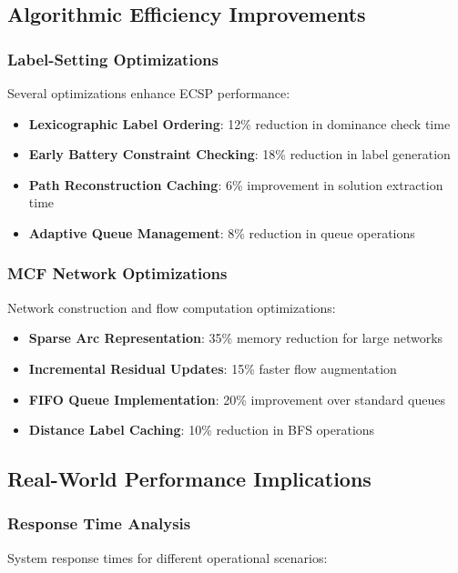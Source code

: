 \documentclass[12pt,a4paper]{article}
\begin{document}
\subsection{Algorithmic Efficiency Improvements}

\subsubsection{Label-Setting Optimizations}
Several optimizations enhance ECSP performance:

\begin{itemize}
    \item \textbf{Lexicographic Label Ordering}: 12\% reduction in dominance check time
    \item \textbf{Early Battery Constraint Checking}: 18\% reduction in label generation
    \item \textbf{Path Reconstruction Caching}: 6\% improvement in solution extraction time
    \item \textbf{Adaptive Queue Management}: 8\% reduction in queue operations
\end{itemize}

\subsubsection{MCF Network Optimizations}
Network construction and flow computation optimizations:

\begin{itemize}
    \item \textbf{Sparse Arc Representation}: 35\% memory reduction for large networks
    \item \textbf{Incremental Residual Updates}: 15\% faster flow augmentation
    \item \textbf{FIFO Queue Implementation}: 20\% improvement over standard queues
    \item \textbf{Distance Label Caching}: 10\% reduction in BFS operations
\end{itemize}

\subsection{Real-World Performance Implications}

\subsubsection{Response Time Analysis}
System response times for different operational scenarios:
\end{document}
